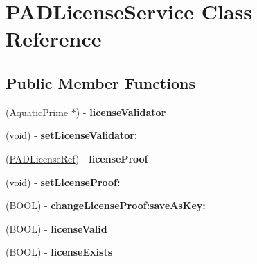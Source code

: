\hypertarget{interface_p_a_d_license_service}{
\section{PADLicenseService Class Reference}
\label{interface_p_a_d_license_service}
}
\subsection*{Public Member Functions}
\begin{DoxyCompactItemize}
\item 
\hypertarget{interface_p_a_d_license_service_ab1b477052e37576bc75e04a2d19a657b}{
(\hyperlink{interface_aquatic_prime}{AquaticPrime} $\ast$) -\/ {\bfseries licenseValidator}}
\label{interface_p_a_d_license_service_ab1b477052e37576bc75e04a2d19a657b}

\item 
\hypertarget{interface_p_a_d_license_service_a7e30268fd2e96382cb04a82ad46d2fad}{
(void) -\/ {\bfseries setLicenseValidator:}}
\label{interface_p_a_d_license_service_a7e30268fd2e96382cb04a82ad46d2fad}

\item 
\hypertarget{interface_p_a_d_license_service_a362dedd99099eba4be1005e0313df207}{
(\hyperlink{interface_p_a_d_license}{PADLicenseRef}) -\/ {\bfseries licenseProof}}
\label{interface_p_a_d_license_service_a362dedd99099eba4be1005e0313df207}

\item 
\hypertarget{interface_p_a_d_license_service_a3a3f7c289c6d04853f51007923cc9165}{
(void) -\/ {\bfseries setLicenseProof:}}
\label{interface_p_a_d_license_service_a3a3f7c289c6d04853f51007923cc9165}

\item 
\hypertarget{interface_p_a_d_license_service_a388a70989c43f48a02a4db572014b633}{
(BOOL) -\/ {\bfseries changeLicenseProof:saveAsKey:}}
\label{interface_p_a_d_license_service_a388a70989c43f48a02a4db572014b633}

\item 
\hypertarget{interface_p_a_d_license_service_a7e85bb724476a4b3f81219f3d1c129cb}{
(BOOL) -\/ {\bfseries licenseValid}}
\label{interface_p_a_d_license_service_a7e85bb724476a4b3f81219f3d1c129cb}

\item 
\hypertarget{interface_p_a_d_license_service_a58e3253794be2dedd5e05b088f87b677}{
(BOOL) -\/ {\bfseries licenseExists}}
\label{interface_p_a_d_license_service_a58e3253794be2dedd5e05b088f87b677}


\end{DoxyCompactItemize}
